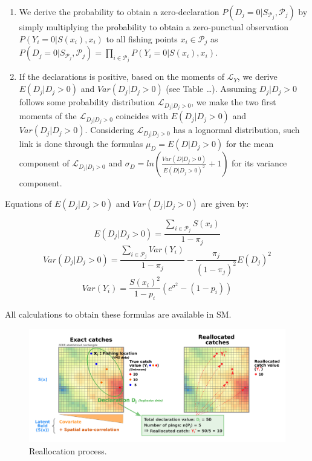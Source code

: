 \documentclass[
  english,
  man]{apa6}
\begin{document}
\begin{enumerate}
\def\labelenumi{(\arabic{enumi})}
\item
  We derive the probability to obtain a zero-declaration \(P(D_j = 0 \vert S_{\mathcal{P}_j},\mathcal{P}_j)\) by simply multiplying the probability to obtain a zero-punctual observation \(P(Y_i=0 \vert S(x_i), x_i)\) to all fishing points \(x_i \in \mathcal{P}_j\) as \(P(D_j = 0 \vert S_{\mathcal{P}_j},\mathcal{P}_j) = \prod_{i \in \mathcal{P}_j} P(Y_i=0 \vert S(x_i), x_i)\).
\item
  If the declarations is positive, based on the moments of \(\mathcal{L}_Y\), we derive \(E(D_j \vert D_j > 0)\) and \(Var(D_j \vert D_j > 0)\) (see Table \ldots). Assuming \(D_j|D_j>0\) follows some probability distribution \(\mathcal{L}_{D_j|D_j>0}\), we make the two first moments of the \(\mathcal{L}_{D_j|D_j>0}\) coincides with \(E(D_j \vert D_j > 0)\) and \(Var(D_j \vert D_j > 0)\). Considering \(\mathcal{L}_{D_j|D_j>0}\) has a lognormal distribution, such link is done through the formulas \(\mu_D = E(D|D_j>0)\) for the mean component of \(\mathcal{L}_{D_j|D_j>0}\) and \(\sigma_D = ln(\frac{Var(D|D_j>0)}{E(D|D_j>0)^2} + 1)\) for its variance component.
\end{enumerate}

Equations of \(E(D_j \vert D_j > 0)\) and \(Var(D_j \vert D_j > 0)\) are given by:

\[E(D_j \vert D_j > 0)=\frac{\sum_{i \in \mathcal{P}_j} S(x_{i})}{1-\pi_j}\]
\[Var(D_j \vert D_j > 0) = \frac{\sum_{i \in \mathcal{P}_j} Var(Y_{i})}{1-\pi_j} - \frac{\pi_j}{(1-\pi_j)^2}E(D_j)^2\]
\[Var(Y_{i})=\frac{S(x_{i})^2}{1-p_{i}}(e^{\sigma^2}-(1-p_{i}))\]

All calculations to obtain these formulas are available in SM.

\begin{figure}
\centering
\includegraphics{images/realloc.png}
\caption{\label{fig:ParBiasSingle} Reallocation process.}
\end{figure}
\end{document}
